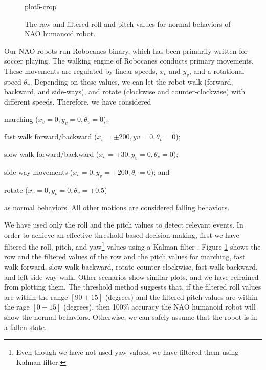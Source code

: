 \documentclass{llncs}
\begin{document}
\begin{sloppy}
\begin{figure}[!t]
{       {plot5-crop}}
  \caption{The raw and filtered roll and pitch values for normal behaviors of NAO humanoid robot.}
  \label{fig:normalBehavior}
\vspace{-6mm}
\end{figure}

Our NAO robots run {\sf Robocanes} binary, which has been primarily written for soccer
playing. The walking engine of {\sf Robocanes} conducts primary movements. These movements are
regulated by linear speeds, $x_v$ and $y_v$, and a rotational speed $\theta_v$. Depending on these
values, we can let the robot walk (forward, backward, and side-ways), and rotate (clockwise and
counter-clockwise) with different speeds. Therefore, we have considered \begin{inparaenum}[(1)]
\item marching ($x_v = 0 , y_v = 0, \theta_v = 0$); \item fast walk forward/backward ($x_v = \pm200
, y v = 0, \theta_v = 0$); \item \item slow walk forward/backward ($x_v = \pm30 , y_v = 0, \theta_v
= 0$); \item side-way movements ($x_v = 0, y_v = \pm200, \theta_v = 0$); and  \item rotate
($x_v = 0 , y_v = 0, \theta_v = \pm 0.5$) \end{inparaenum} as normal behaviors. All other motions
are considered falling behaviors. 


We have used only the roll and the pitch values  to detect relevant events. In order to achieve an
effective threshold based decision making, first we have filtered the roll, pitch, and
yaw\footnote{Even though we have not used yaw values, we have filtered them using Kalman filter.}
values using a Kalman filter \cite{Welch:1995:IKF:897831}. Figure \ref{fig:normalBehavior} shows
the row and the filtered values of the row and the pitch values for marching, fast walk forward,
slow walk backward, rotate counter-clockwise, fast walk backward, and left side-way walk. Other
scenarios show similar plots, and we have refrained from plotting them. The threshold method
suggests that, if the filtered roll values are within the range $[90\pm15]$ (degrees) and the
filtered pitch values are within the rage $[0\pm15]$ (degrees), then 100\% accuracy the NAO humanoid
robot will show the normal behaviors. Otherwise, we can safely assume that the robot is in a fallen
state.   


\end{sloppy}
\end{document}
